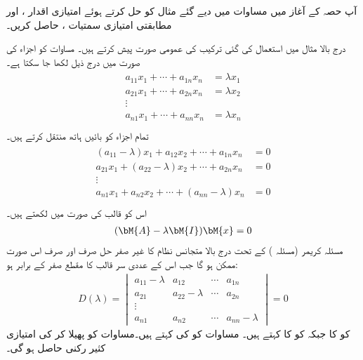 آپ حصہ  کے آغاز میں مساوات  میں دیے گئے مثال کو حل کرتے ہوئے  امتیازی اقدار ،  اور  مطابقتی امتیازی سمتیات ،  حاصل کریں۔

درج بالا مثال میں استعمال کی گئی ترکیب کی عمومی صورت پیش کرتے ہیں۔ مساوات  کو اجزاء کی صورت میں درج ذیل لکھا جا سکتا ہے۔
\begin{gather}
\begin{aligned}\label{مساوات_امتیازی_متجانس_نظام_الف}
a_{11}x_1+\cdots +a_{1n}x_n&=\lambda x_1\\
a_{21}x_1+\cdots +a_{2n}x_n&=\lambda x_2\\
\vdots&\\
a_{n1}x_1+\cdots +a_{nn}x_n&=\lambda x_n\\
\end{aligned}
\end{gather}
تمام اجزاء کو بائیں ہاتھ منتقل کرتے ہیں۔
\begin{gather}
\begin{aligned}\label{مساوات_امتیازی_متجانس_نظام_ب}
(a_{11}-\lambda)x_1+a_{12}x_2+\cdots +a_{1n}x_n&=0\\
a_{21}x_1+(a_{22}-\lambda)x_2+\cdots +a_{2n}x_n&=0\\
\vdots&\\
a_{n1}x_1+a_{n2}x_2+\cdots +(a_{nn}-\lambda)x_n&=0\\
\end{aligned}
\end{gather}
اس کو قالب کی صورت میں لکھتے ہیں۔
\begin{align}\label{مساوات_امتیازی_متجانس_نظام_پ}
(\bM{A}-\lambda \bM{I})\bM{x}=0
\end{align}
مسئلہ کریمر (مسئلہ ) کے تحت درج بالا متجانس نظام کا غیر صفر حل صرف اور صرف اس صورت ممکن ہو گا جب  اس کے عددی سر قالب کا مقطع صفر کے برابر ہو:
\begin{align}\label{مساوات_امتیازی_متجانس_نظام_ت}
D(\lambda)=\begin{vmatrix} a_{11}-\lambda & a_{12}&\cdots & a_{1n} \\ a_{21}& a_{22}-\lambda&\cdots & a_{2n}\\ \vdots \\ a_{n1}& a_{n2}&\cdots & a_{nn}-\lambda \end{vmatrix}=0
\end{align} 
 کو  کا   جبکہ   کو  کا  کہتے ہیں۔ مساوات  کو  کی  کہتے ہیں۔مساوات  کو پھیلا کر  کی امتیازی کثیر رکنی حاصل ہو گی۔

